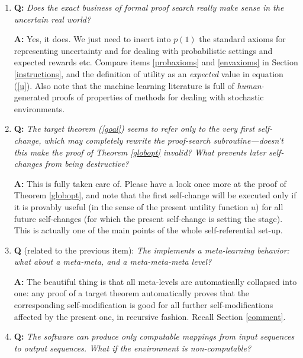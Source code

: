 \begin{enumerate}

\item
{\bf Q:} {\em 
Does the exact business of formal proof search 
really make sense in the uncertain real world?
}

{\bf A:} 
Yes, it does. We just need to insert into $p(1)$ the standard axioms 
for representing uncertainty and for dealing with
probabilistic settings and expected rewards etc. 
Compare items 
\ref{probaxioms} and \ref{envaxioms}
in Section \ref{instructions}, and the definition
of utility as an {\em expected} value in equation (\ref{u}).
Also note that the machine learning literature is
full of {\em human}-generated proofs of properties 
of methods for dealing with stochastic environments.

\item
{\bf Q:} {\em 
The target theorem (\ref{goal}) seems to refer only
to the {\em very first} self-change, which  may completely 
rewrite the proof-search subroutine---doesn't this
make the proof of Theorem \ref{globopt} invalid?
What prevents later self-changes from being destructive?
}

{\bf A:} 
This is fully taken care of.
Please have a look once more at the 
proof of Theorem \ref{globopt},
and note that the first self-change will
be executed only if it is provably useful 
(in the sense of the present untility function $u$)
for all
future self-changes (for which the present self-change is setting
the stage). This is actually one of the main points of
the whole self-referential set-up.

\item
{\bf Q} (related to the previous item): {\em 
The \gm implements a meta-learning behavior: what about a 
meta-meta, and a meta-meta-meta level? 
}

{\bf A:} 
The beautiful thing is that all meta-levels are 
automatically collapsed into one: any proof
of a target theorem automatically proves 
that the corresponding self-modification is good for all
further self-modifications affected by the present one,
in recursive fashion. Recall Section \ref{comment}.

\item
{\bf Q:} {\em 
The \gm software can produce only computable mappings
from input sequences to output sequences.
What if the environment is non-computable?
}


\end{enumerate}

